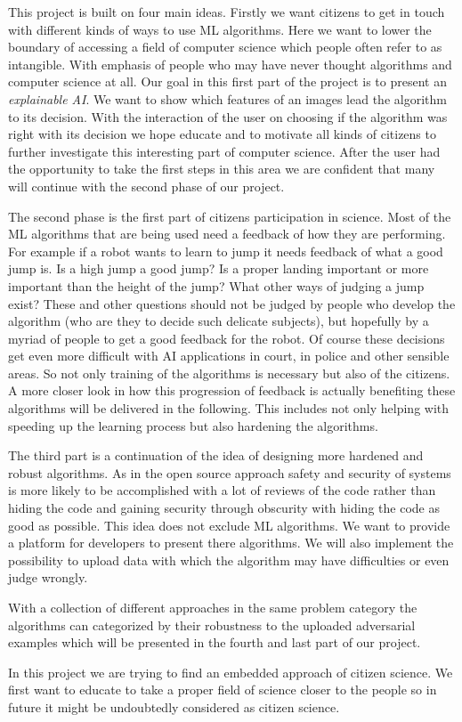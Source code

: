 This project is built on four main ideas.
Firstly we want citizens to get in touch with different kinds of ways to use ML algorithms. 
Here we want to lower the boundary of accessing a field of computer science which people often refer to as intangible.
With emphasis of people who may have never thought algorithms and computer science at all.
Our goal in this first part of the project is to present an \textit{explainable AI}.
We want to show which features of an images lead the algorithm to its decision.
With the interaction of the user on choosing if the algorithm was right with its decision we hope educate and to motivate all kinds of citizens to further investigate this interesting part of computer science.
After the user had the opportunity to take the first steps in this area we are confident that many will continue with the second phase of our project.

The second phase is the first part of citizens participation in science. 
Most of the ML algorithms that are being used need a feedback of how they are performing. 
For example if a robot wants to learn to jump it needs feedback of what a good jump is.
Is a high jump a good jump?
Is a proper landing important or more important than the height of the jump?
What other ways of judging a jump exist?
These and other questions should not be judged by people who develop the algorithm (who are they to decide such delicate subjects), but hopefully by a myriad of people to get a good feedback for the robot.
Of course these decisions get even more difficult with AI applications in court, in police and other sensible areas.
So not only training of the algorithms is necessary but also of the citizens.
A more closer look in how this progression of feedback is actually benefiting these algorithms will be delivered in the following.
This includes not only helping with speeding up the learning process but also hardening the algorithms.

The third part is a continuation of the idea of designing more hardened and robust algorithms.
As in the open source approach safety and security of systems is more likely to be accomplished with a lot of reviews of the code rather than hiding the code and gaining security through obscurity with hiding the code as good as possible.
This idea does not exclude ML algorithms. We want to provide a platform for developers to present there algorithms.
We will also implement the possibility to upload data with which the algorithm may have difficulties or even judge wrongly.

With a collection of different approaches in the same problem category the algorithms can categorized by their robustness to the uploaded adversarial examples which will be presented in the fourth and last part of our project.

In this project we are trying to find an embedded approach of citizen science.
We first want to educate to take a proper field of science closer to the people so in future it might be undoubtedly considered as citizen science.



